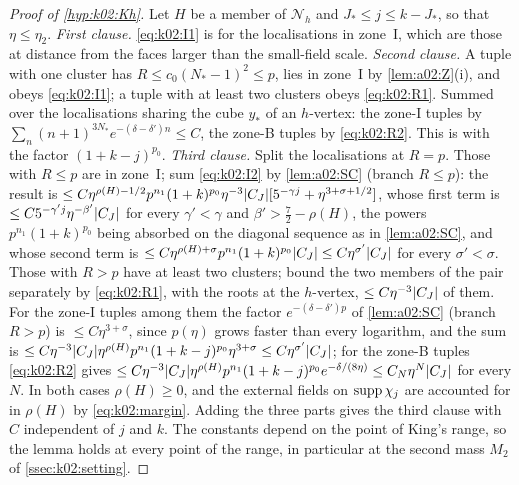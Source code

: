 \begin{proof}[Proof of \cref{hyp:k02:Kh}]
Let $H$ be a member of $\mathcal N_h$ and $J_*\le j\le k-J_*$, so that $\eta\le\eta_2$. \emph{First clause.} \eqref{eq:k02:I1} is \cite[(3.39)]{K1} for the localisations in zone~I, which are those at distance from the faces larger than the small-field scale. \emph{Second clause.} A tuple with one cluster has $R\le c_0(N_*-1)^2\le p$, lies in zone~I by \cref{lem:a02:Z}(i), and obeys \eqref{eq:k02:I1}; a tuple with at least two clusters obeys \eqref{eq:k02:R1}. Summed over the localisations sharing the cube $y_*$ of an $h$-vertex: the zone-I tuples by $\sum_n(n+1)^{3N_*}e^{-(\delta-\delta')n}\le C$, the zone-B tuples by \eqref{eq:k02:R2}. This is \cite[(3.38)]{K1} with the factor $(1+k-j)^{p_0}$. \emph{Third clause.} Split the localisations at $R=p$. Those with $R\le p$ are in zone~I; sum \eqref{eq:k02:I2} by \cref{lem:a02:SC} (branch $R\le p$): the result is $\le C\eta^{\rho(H)-1/2}p^{n_1}(1+k)^{p_0}\eta^{-3}|C_J|[5^{-\gamma j}+\eta^{3+\sigma+1/2}]$, whose first term is $\le C5^{-\gamma'j}\eta^{-\beta'}|C_J|$ for every $\gamma'<\gamma$ and $\beta'>\frac72-\rho(H)$, the powers $p^{n_1}(1+k)^{p_0}$ being absorbed on the diagonal sequence as in \cref{lem:a02:SC}, and whose second term is $\le C\eta^{\rho(H)+\sigma}p^{n_1}(1+k)^{p_0}|C_J|\le C\eta^{\sigma'}|C_J|$ for every $\sigma'<\sigma$. Those with $R>p$ have at least two clusters; bound the two members of the pair separately by \eqref{eq:k02:R1}, with the roots at the $h$-vertex, $\le C\eta^{-3}|C_J|$ of them. For the zone-I tuples among them the factor $e^{-(\delta-\delta')p}$ of \cref{lem:a02:SC} (branch $R>p$) is $\le C\eta^{3+\sigma}$, since $p(\eta)$ grows faster than every logarithm, and the sum is $\le C\eta^{-3}|C_J|\eta^{\rho(H)}p^{n_1}(1+k-j)^{p_0}\eta^{3+\sigma}\le C\eta^{\sigma'}|C_J|$; for the zone-B tuples \eqref{eq:k02:R2} gives $\le C\eta^{-3}|C_J|\eta^{\rho(H)}p^{n_1}(1+k-j)^{p_0}e^{-\delta/(8\eta)}\le C_N\eta^N|C_J|$ for every $N$. In both cases $\rho(H)\ge0$, and the external fields on $\operatorname{supp}\chi_j$ are accounted for in $\rho(H)$ by \eqref{eq:k02:margin}. Adding the three parts gives the third clause with $C$ independent of $j$ and $k$. The constants depend on the point of King's range, so the lemma holds at every point of the range, in particular at the second mass $M_2$ of \cref{ssec:k02:setting}.
\end{proof}
